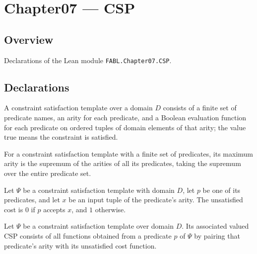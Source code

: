 \chapter{Chapter07 — CSP}
\section{Overview}

Declarations of the Lean module \texttt{FABL.Chapter07.CSP}.

\section{Declarations}

\begin{definition}
\label{FABL.CSPTemplate}
\leanok
A constraint satisfaction template over a domain $D$ consists of a finite set of
predicate names, an arity for each predicate, and a Boolean evaluation function for each
predicate on ordered tuples of domain elements of that arity; the value true means the
constraint is satisfied.
\end{definition}

\begin{definition}
\label{FABL.CSPTemplate.maxArity}
\leanok
For a constraint satisfaction template with a finite set of predicates, its maximum
arity is the supremum of the arities of all its predicates, taking the supremum over the
entire predicate set.
\end{definition}

\begin{definition}
\label{FABL.CSPTemplate.unsatisfiedCost}
\leanok
Let $\Psi$ be a constraint satisfaction template with domain $D$, let $p$ be one of its
predicates, and let $x$ be an input tuple of the predicate's arity. The unsatisfied cost
is $0$ if $p$ accepts $x$, and $1$ otherwise.
\end{definition}

\begin{definition}
\label{FABL.CSPTemplate.toValuedCSP}
\leanok
{}
Let $\Psi$ be a constraint satisfaction template over domain $D$. Its associated valued
CSP consists of all functions obtained from a predicate $p$ of $\Psi$ by pairing that
predicate's arity with its unsatisfied cost function.
\end{definition}

